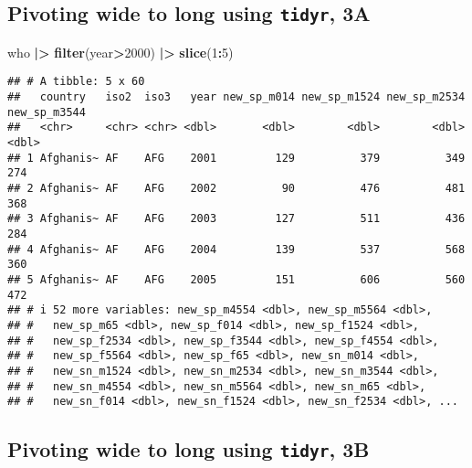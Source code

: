 \documentclass[
  11pt,
]{article}
\newenvironment{Shaded}{\begin{snugshade}}{\end{snugshade}}
\newcommand{\DecValTok}[1]{\textcolor[rgb]{0.00,0.00,0.81}{#1}}
\newcommand{\FunctionTok}[1]{\textcolor[rgb]{0.13,0.29,0.53}{\textbf{#1}}}
\newcommand{\NormalTok}[1]{#1}
\newcommand{\SpecialCharTok}[1]{\textcolor[rgb]{0.81,0.36,0.00}{\textbf{#1}}}
\begin{document}
\normalsize

\hypertarget{pivoting-wide-to-long-using-tidyr-3a}{%
\subsection{\texorpdfstring{Pivoting wide to long using \texttt{tidyr},
3A}{Pivoting wide to long using tidyr, 3A}}\label{pivoting-wide-to-long-using-tidyr-3a}}

\footnotesize

\begin{Shaded}
\begin{Highlighting}[]
\NormalTok{who }\SpecialCharTok{|\textgreater{}} \FunctionTok{filter}\NormalTok{(year}\SpecialCharTok{\textgreater{}}\DecValTok{2000}\NormalTok{) }\SpecialCharTok{|\textgreater{}} \FunctionTok{slice}\NormalTok{(}\DecValTok{1}\SpecialCharTok{:}\DecValTok{5}\NormalTok{)}
\end{Highlighting}
\end{Shaded}

\begin{verbatim}
## # A tibble: 5 x 60
##   country   iso2  iso3   year new_sp_m014 new_sp_m1524 new_sp_m2534 new_sp_m3544
##   <chr>     <chr> <chr> <dbl>       <dbl>        <dbl>        <dbl>        <dbl>
## 1 Afghanis~ AF    AFG    2001         129          379          349          274
## 2 Afghanis~ AF    AFG    2002          90          476          481          368
## 3 Afghanis~ AF    AFG    2003         127          511          436          284
## 4 Afghanis~ AF    AFG    2004         139          537          568          360
## 5 Afghanis~ AF    AFG    2005         151          606          560          472
## # i 52 more variables: new_sp_m4554 <dbl>, new_sp_m5564 <dbl>,
## #   new_sp_m65 <dbl>, new_sp_f014 <dbl>, new_sp_f1524 <dbl>,
## #   new_sp_f2534 <dbl>, new_sp_f3544 <dbl>, new_sp_f4554 <dbl>,
## #   new_sp_f5564 <dbl>, new_sp_f65 <dbl>, new_sn_m014 <dbl>,
## #   new_sn_m1524 <dbl>, new_sn_m2534 <dbl>, new_sn_m3544 <dbl>,
## #   new_sn_m4554 <dbl>, new_sn_m5564 <dbl>, new_sn_m65 <dbl>,
## #   new_sn_f014 <dbl>, new_sn_f1524 <dbl>, new_sn_f2534 <dbl>, ...
\end{verbatim}

\normalsize

\hypertarget{pivoting-wide-to-long-using-tidyr-3b}{%
\subsection{\texorpdfstring{Pivoting wide to long using \texttt{tidyr},
3B}{Pivoting wide to long using tidyr, 3B}}\label{pivoting-wide-to-long-using-tidyr-3b}}
\end{document}
